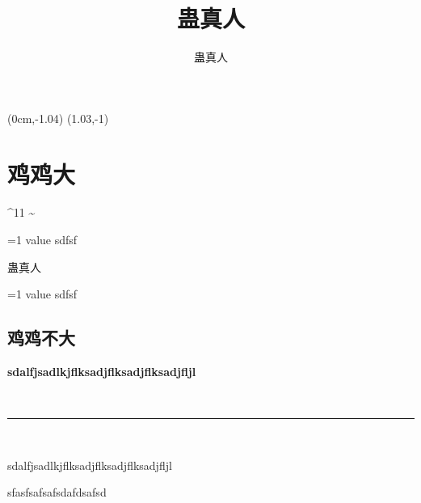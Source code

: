 \documentclass[hyperref,UTF8]{ctexrep}
\title{蛊真人}
\author{蛊真人}
\newenvironment{thisBody}
	{
		\zihao{3}
	}%
	{
		\clearpage
	}%
\begin{document}
\fancyput*(0cm,-1.04\textheight){ \setlength\fboxsep{0pt} \noindent\framebox[1.03\textwidth]{ \noindent \rule{0cm}{ 1.04\textheight } } }
\fancyput*(1.03\textwidth,-1\textheight){ \setlength\fboxsep{0pt} \noindent\framebox[2cm]{ \noindent \rule{0cm}{ \textheight } } }

 
\maketitle%
 

 


\newcommand\testvvvv[1]{ \ifnum #1=1 value \fi sdfsf }


\chapter{鸡鸡大}


\female
\mars
\male

\textdegree
\textasciicircum{}11
\textasciitilde{}
\textemdash\textemdash
 \newmoon
 \rightmoon
 \fullmoon
 \leftmoon



\testvvvv{1}

蛊真人

\testvvvv{0}

\setcounter{secnumdepth}{-2}
\section{鸡鸡不大}
\setcounter{secnumdepth}{3}

	\begin{thisBody} 
		\textbf {sdalfjsadlkjflksadjflksadjflksadjfljl}

\noindent \, \hfill \rule[0.5ex]{0.95\linewidth}{0.5pt} \hfill \,

\noindent		\dag \hfill sdalfjsadlkjflksadjflksadjflksadjfljl \hfill \dag 

		sfasfsafsafsdafdsafsd
	\end{thisBody}
\end{document}
